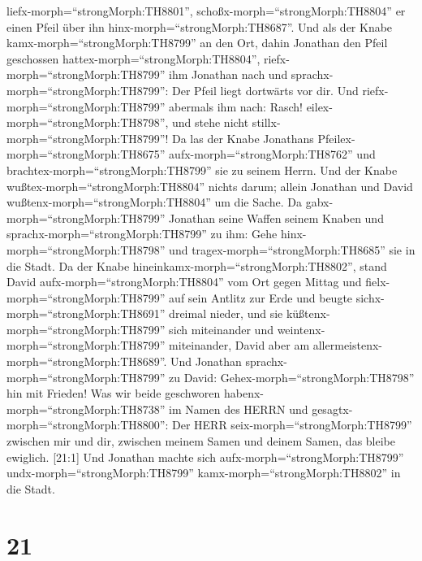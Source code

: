 liefx-morph=``strongMorph:TH8801'', schoßx-morph=``strongMorph:TH8804''
er einen Pfeil über ihn hinx-morph=``strongMorph:TH8687''. 
Und als der Knabe kamx-morph=``strongMorph:TH8799'' an den Ort, dahin
Jonathan den Pfeil geschossen hattex-morph=``strongMorph:TH8804'',
riefx-morph=``strongMorph:TH8799'' ihm Jonathan nach und
sprachx-morph=``strongMorph:TH8799'': Der Pfeil liegt dortwärts vor dir.
 Und riefx-morph=``strongMorph:TH8799'' abermals ihm nach:
Rasch! eilex-morph=``strongMorph:TH8798'', und stehe nicht
stillx-morph=``strongMorph:TH8799''! Da las der Knabe Jonathans
Pfeilex-morph=``strongMorph:TH8675'' aufx-morph=``strongMorph:TH8762''
und brachtex-morph=``strongMorph:TH8799'' sie zu seinem Herrn.
 Und der Knabe wußtex-morph=``strongMorph:TH8804'' nichts
darum; allein Jonathan und David wußtenx-morph=``strongMorph:TH8804'' um
die Sache.  Da gabx-morph=``strongMorph:TH8799'' Jonathan
seine Waffen seinem Knaben und sprachx-morph=``strongMorph:TH8799'' zu
ihm: Gehe hinx-morph=``strongMorph:TH8798'' und
tragex-morph=``strongMorph:TH8685'' sie in die Stadt.  Da
der Knabe hineinkamx-morph=``strongMorph:TH8802'', stand David
aufx-morph=``strongMorph:TH8804'' vom Ort gegen Mittag und
fielx-morph=``strongMorph:TH8799'' auf sein Antlitz zur Erde und beugte
sichx-morph=``strongMorph:TH8691'' dreimal nieder, und sie
küßtenx-morph=``strongMorph:TH8799'' sich miteinander und
weintenx-morph=``strongMorph:TH8799'' miteinander, David aber am
allermeistenx-morph=``strongMorph:TH8689''.  Und Jonathan
sprachx-morph=``strongMorph:TH8799'' zu David:
Gehex-morph=``strongMorph:TH8798'' hin mit Frieden! Was wir beide
geschworen habenx-morph=``strongMorph:TH8738'' im Namen des HERRN und
gesagtx-morph=``strongMorph:TH8800'': Der HERR
seix-morph=``strongMorph:TH8799'' zwischen mir und dir, zwischen meinem
Samen und deinem Samen, das bleibe ewiglich. {[}21:1{]} Und Jonathan
machte sich aufx-morph=``strongMorph:TH8799''
undx-morph=``strongMorph:TH8799'' kamx-morph=``strongMorph:TH8802'' in
die Stadt.

\hypertarget{section-20}{%
\section{21}\label{section-20}}

